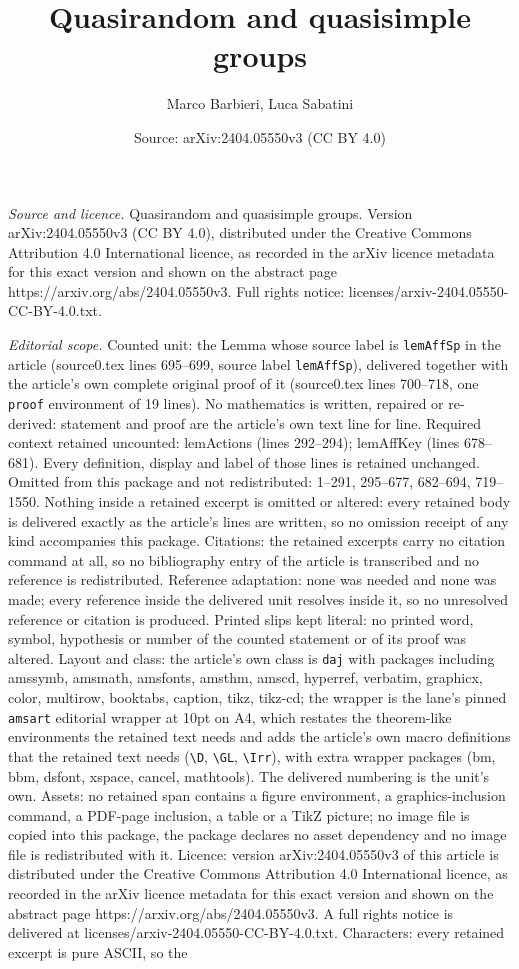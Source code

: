 \documentclass[10pt,a4paper]{amsart}
\title[Quasirandom and quasisimple groups]{Quasirandom and quasisimple groups}
\author{Marco Barbieri, Luca Sabatini}
\date{Source: arXiv:2404.05550v3 (CC BY 4.0)}
\begin{document}
\maketitle

\noindent\emph{Source and licence.} Quasirandom and quasisimple groups. Version arXiv:2404.05550v3 (CC BY 4.0), distributed under the Creative Commons Attribution 4.0 International licence, as recorded in the arXiv licence metadata for this exact version and shown on the abstract page https://arxiv.org/abs/2404.05550v3. Full rights notice: licenses/arxiv-2404.05550-CC-BY-4.0.txt.\par\smallskip

\noindent\textit{Editorial scope.} Counted unit: the Lemma whose source label is \texttt{lemAffSp} in the article (source0.tex lines 695--699, source label \texttt{lemAffSp}), delivered together with the article's own complete original proof of it (source0.tex lines 700--718, one \texttt{proof} environment of 19 lines). No mathematics is written, repaired or re-derived: statement and proof are the article's own text line for line. Required context retained uncounted: lemActions (lines 292--294); lemAffKey (lines 678--681). Every definition, display and label of those lines is retained unchanged. Omitted from this package and not redistributed: 1--291, 295--677, 682--694, 719--1550. Nothing inside a retained excerpt is omitted or altered: every retained body is delivered exactly as the article's lines are written, so no omission receipt of any kind accompanies this package. Citations: the retained excerpts carry no citation command at all, so no bibliography entry of the article is transcribed and no reference is redistributed. Reference adaptation: none was needed and none was made; every reference inside the delivered unit resolves inside it, so no unresolved reference or citation is produced. Printed slips kept literal: no printed word, symbol, hypothesis or number of the counted statement or of its proof was altered. Layout and class: the article's own class is \texttt{daj} with packages including amssymb, amsmath, amsfonts, amsthm, amscd, hyperref, verbatim, graphicx, color, multirow, booktabs, caption, tikz, tikz-cd; the wrapper is the lane's pinned \texttt{amsart} editorial wrapper at 10pt on A4, which restates the theorem-like environments the retained text needs and adds the article's own macro definitions that the retained text needs (\texttt{\textbackslash D}, \texttt{\textbackslash GL}, \texttt{\textbackslash Irr}), with extra wrapper packages (bm, bbm, dsfont, xspace, cancel, mathtools). The delivered numbering is the unit's own. Assets: no retained span contains a figure environment, a graphics-inclusion command, a PDF-page inclusion, a table or a TikZ picture; no image file is copied into this package, the package declares no asset dependency and no image file is redistributed with it. Licence: version arXiv:2404.05550v3 of this article is distributed under the Creative Commons Attribution 4.0 International licence, as recorded in the arXiv licence metadata for this exact version and shown on the abstract page https://arxiv.org/abs/2404.05550v3. A full rights notice is delivered at licenses/arxiv-2404.05550-CC-BY-4.0.txt. Characters: every retained excerpt is pure ASCII, so the 
\end{document}
